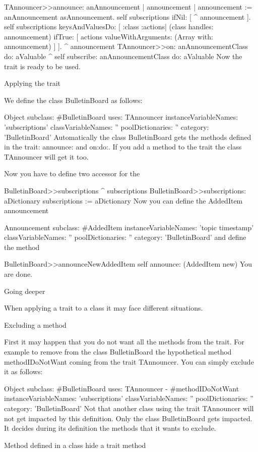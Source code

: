 TAnnouncer>>announce: anAnnouncement
	| announcement |
	announcement := anAnnouncement asAnnouncement.
	self subscriptions ifNil: [ ^ announcement ].
	self subscriptions keysAndValuesDo: [ :class :actions|
		(class handles: announcement) 
			ifTrue: [ actions valueWithArguments: (Array with: announcement) ] ].
	^ announcement
TAnnouncer>>on: anAnnouncementClass do: aValuable
	^ self subscribe: anAnnouncementClass do: aValuable
Now the trait is ready to be used.

Applying the trait

We define the class BulletinBoard as follows:

Object subclass: #BulletinBoard
	uses: TAnnouncer
	instanceVariableNames: 'subscriptions'
	classVariableNames: ''
	poolDictionaries: ''
	category: 'BulletinBoard'
Automatically the class BulletinBoard gets the methods defined in the trait: announce: and on:do:. If you add a method to the trait the class TAnnouncer will get it too.

Now you have to define two accessor for the

BulletinBoard>>subscriptions
 	^ subscriptions
BulletinBoard>>subscriptions: aDictionary
 	 subscriptions := aDictionary
Now you can define the AddedItem announcement

Announcement subclass: #AddedItem
	instanceVariableNames: 'topic timestamp'
	classVariableNames: ''
	poolDictionaries: ''
	category: 'BulletinBoard'
and define the method

BulletinBoard>>announceNewAddedItem
	self announce: (AddedItem new)
You are done.

Going deeper

When applying a trait to a class it may face different situations.

Excluding a method

First it may happen that you do not want all the methods from the trait. For example to remove from the class BulletinBoard the hypothetical method methodIDoNotWant coming from the trait TAnnouncer. You can simply exclude it as follows:

Object subclass: #BulletinBoard
	uses: TAnnouncer - {#methodIDoNotWant}
	instanceVariableNames: 'subscriptions'
	classVariableNames: ''
	poolDictionaries: ''
	category: 'BulletinBoard'
Not that another class using the trait TAnnouncer will not get impacted by this definition. Only the class BulletinBoard gets impacted. It decides during its definition the methods that it wants to exclude.

Method defined in a class hide a trait method

